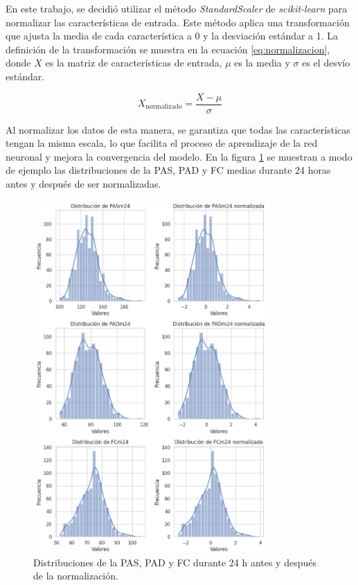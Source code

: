 En este trabajo, se decidió utilizar el método \emph{StandardScaler} de \emph{scikit-learn} para 
normalizar las características de entrada. Este método aplica una transformación que ajusta la 
media de cada característica a 0 y la desviación estándar a 1. La definición de la transformación 
se muestra en la ecuación \ref{eq:normalizacion}, donde $X$ es la matriz de características de 
entrada, $\mu$ es la media y $\sigma$ es el desvío estándar. 

\begin{equation}
	\label{eq:normalizacion}
	X_{\text{normalizado}} = \frac{X - \mu}{\sigma}
\end{equation}

Al normalizar los datos de esta manera, se garantiza que todas las características tengan la 
misma escala, lo que facilita el proceso de aprendizaje de la red neuronal y mejora la convergencia 
del modelo. En la figura \ref{fig:normalizacion} se muestran a modo de ejemplo las distribuciones de 
la PAS, PAD y FC medias durante 24 horas antes y después de ser normalizadas. 

\begin{figure}[h!]
	\centering
	\includegraphics[width=0.8\textwidth]{./Figures/normalizacion.png}
	\caption{Distribuciones de la PAS, PAD y FC durante 24 h antes y después de la normalización.}\label{fig:normalizacion}
\end{figure}

